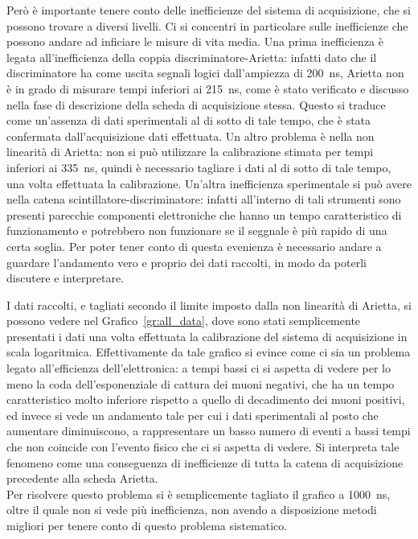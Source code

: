 Però è importante tenere conto delle inefficienze del sistema di acquisizione, che si possono trovare a diversi livelli. Ci si concentri in particolare sulle inefficienze che possono andare ad inficiare le misure di vita media. Una prima inefficienza è legata all'inefficienza della coppia discriminatore-Arietta: infatti dato che il discriminatore ha come uscita segnali logici dall'ampiezza di 200~ns, Arietta non è in grado di misurare tempi inferiori ai 215~ns, come è stato verificato e discusso nella fase di descrizione della scheda di acquisizione stessa. Questo si traduce come un'assenza di dati sperimentali al di sotto di tale tempo, che è stata confermata dall'acquisizione dati effettuata. Un altro problema è nella non linearità di Arietta: non si può utilizzare la calibrazione stimata per tempi inferiori ai 335~ns, quindi è necessario tagliare i dati al di sotto di tale tempo, una volta effettuata la calibrazione. Un'altra inefficienza sperimentale si può avere nella catena scintillatore-discriminatore: infatti all'interno di tali strumenti sono presenti parecchie componenti elettroniche che hanno un tempo caratteristico di funzionamento e potrebbero non funzionare se il seggnale è più rapido di una certa soglia. Per poter tener conto di questa evenienza è necessario andare a guardare l'andamento vero e proprio dei dati raccolti, in  modo da poterli discutere e interpretare.\\

I dati raccolti, e tagliati secondo il limite imposto dalla non linearità di Arietta, si possono vedere nel Grafico~\ref{gr:all_data}, dove sono stati semplicemente presentati i dati una volta effettuata la calibrazione del sistema di acquisizione in scala logaritmica. Effettivamente da tale grafico si evince  come ci sia un problema legato all'efficienza dell'elettronica: a tempi bassi ci si aspetta di vedere per lo meno la coda dell'esponenziale di cattura dei muoni negativi, che ha un tempo caratteristico molto inferiore rispetto a quello di decadimento dei muoni positivi, ed invece si vede un andamento tale per cui i dati sperimentali al posto che aumentare diminuiscono, a rappresentare un basso numero di eventi a bassi tempi che non coincide con l'evento fisico che ci si aspetta di vedere. Si interpreta tale fenomeno come una conseguenza di inefficienze di tutta la catena di acquisizione precedente alla scheda Arietta.\\

Per risolvere questo problema si è semplicemente tagliato il grafico a 1000~ns, oltre il quale non si vede più inefficienza, non avendo a disposizione metodi migliori per tenere conto di questo problema sistematico.\\

